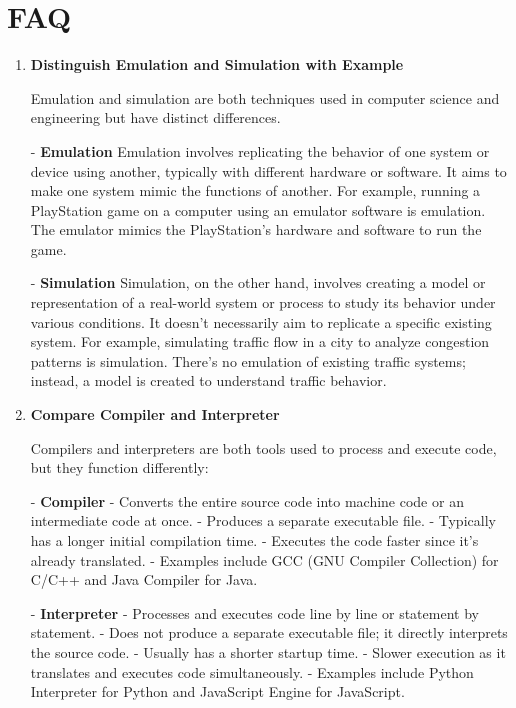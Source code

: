 \documentclass[11pt]{article}
\begin{document}
\section{FAQ}

\begin{enumerate}
    \item \textbf{Distinguish Emulation and Simulation with Example}

          Emulation and simulation are both techniques used in computer science and engineering but have distinct differences.

          - \textbf{Emulation} Emulation involves replicating the behavior of one system or device using another, typically with different hardware or software. It aims to make one system mimic the functions of another. For example, running a PlayStation game on a computer using an emulator software is emulation. The emulator mimics the PlayStation's hardware and software to run the game.

          - \textbf{Simulation} Simulation, on the other hand, involves creating a model or representation of a real-world system or process to study its behavior under various conditions. It doesn't necessarily aim to replicate a specific existing system. For example, simulating traffic flow in a city to analyze congestion patterns is simulation. There's no emulation of existing traffic systems; instead, a model is created to understand traffic behavior.

    \item \textbf{Compare Compiler and Interpreter}

          Compilers and interpreters are both tools used to process and execute code, but they function differently:

          - \textbf{Compiler}
          - Converts the entire source code into machine code or an intermediate code at once.
          - Produces a separate executable file.
          - Typically has a longer initial compilation time.
          - Executes the code faster since it's already translated.
          - Examples include GCC (GNU Compiler Collection) for C/C++ and Java Compiler for Java.

          - \textbf{Interpreter}
          - Processes and executes code line by line or statement by statement.
          - Does not produce a separate executable file; it directly interprets the source code.
          - Usually has a shorter startup time.
          - Slower execution as it translates and executes code simultaneously.
          - Examples include Python Interpreter for Python and JavaScript Engine for JavaScript.


\end{enumerate}
\end{document}
